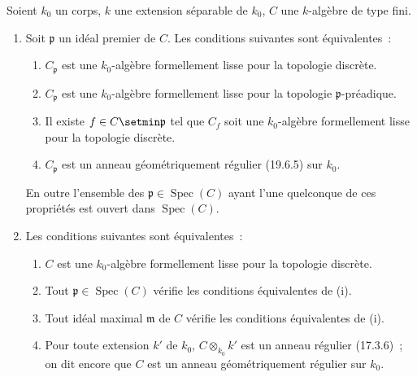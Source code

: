 \begin{proposition}[22.6.7]
\label{0.22.6.7-fr}
Soient $k_0$ un corps, $k$ une extension séparable de $k_0$, $C$ une
$k$-algèbre de type fini.
\begin{enumerate}
  \item[\rm(i)] Soit $\mathfrak p$ un idéal premier de $C$. Les conditions
  suivantes sont équivalentes~:
  \begin{enumerate}
    \item[\textup{a)}] $C_{\mathfrak p}$ est une $k_0$-algèbre formellement lisse pour
    la topologie discrète.
    \item[\textup{b)}] $C_{\mathfrak p}$ est une $k_0$-algèbre formellement lisse pour
    la topologie $\mathfrak p$-préadique.
    \item[\textup{c)}] Il existe $f\in C\setmin\mathfrak p$ tel que $C_f$ soit une
    $k_0$-algèbre formellement lisse pour la topologie discrète.
    \item[\textup{d)}] $C_{\mathfrak p}$ est un anneau géométriquement régulier
    \textup{(19.6.5)} sur $k_0$.
  \end{enumerate}
  En outre l'ensemble des $\mathfrak p\in\operatorname{Spec}(C)$ ayant l'une quelconque de
  ces propriétés est ouvert dans $\operatorname{Spec}(C)$.
  \item[\rm(ii)] Les conditions suivantes sont équivalentes~:
  \begin{enumerate}
    \item[\textup{a)}] $C$ est une $k_0$-algèbre formellement lisse pour la topologie
    discrète.
    \item[\textup{b)}] Tout $\mathfrak p\in\operatorname{Spec}(C)$ vérifie les conditions
    équivalentes de \textup{(i)}.
    \item[\textup{c)}] Tout idéal maximal $\mathfrak m$ de $C$ vérifie les conditions
    équivalentes de \textup{(i)}.
    \item[\textup{d)}] Pour toute extension $k'$ de $k_0$, $C\otimes_{k_0}k'$ est un
    anneau régulier \textup{(17.3.6)}~; on dit encore que $C$ est un anneau
    géométriquement régulier sur $k_0$.
  \end{enumerate}



\end{enumerate}
\end{proposition}

